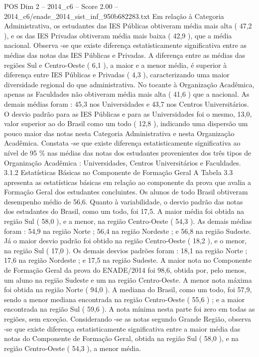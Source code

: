 \begin{textsample}{POS Dim 2 – 2014\_c6 – Score 2.00 – 2014\_c6/enade\_2014\_sist\_inf\_950b682283.txt}
Em relação à Categoria Administrativa, os estudantes das IES Públicas obtiveram média mais alta ( 47,2 ), e os das IES Privadas obtiveram média mais baixa ( 42,9 ), que a média nacional.
Observa -se que existe diferença estatisticamente significativa entre as médias das notas das IES Públicas e Privadas.
A diferença entre as médias das regiões Sul e Centro-Oeste ( 6,1 ), a maior e a menor média, é superior à diferença entre IES Públicas e Privadas ( 4,3 ), caracterizando uma maior diversidade regional do que administrativa.
No tocante à Organização Acadêmica, apenas as Faculdades não obtiveram média mais alta ( 41,6 ) que a nacional.
As demais médias foram : 45,3 nos Universidades e 43,7 nos Centros Universitários.
O desvio padrão para as IES Públicas e para as Universidades foi o mesmo, 13,0, valor superior ao do Brasil como um todo ( 12,8 ), indicando uma dispersão um pouco maior das notas nesta Categoria Administrativa e nesta Organização Acadêmica.
Constata -se que existe diferença estatisticamente significativa ao nível de 95 \% nas médias das notas dos estudantes provenientes dos três tipos de Organização Acadêmica : Universidades, Centros Universitários e Faculdades. 3.1.2 Estatísticas Básicas no Componente de Formação Geral A Tabela 3.3 apresenta as estatísticas básicas em relação ao componente da prova que avalia a Formação Geral dos estudantes concluintes.
Os alunos de todo Brasil obtiveram desempenho médio de 56,6.
Quanto à variabilidade, o desvio padrão das notas dos estudantes do Brasil, como um todo, foi 17,5.
A maior média foi obtida na região Sul ( 58,0 ), e a menor, na região Centro-Oeste ( 54,3 ).
As demais médias foram : 54,9 na região Norte ; 56,4 na região Nordeste ; e 56,8 na região Sudeste.
Já o maior desvio padrão foi obtido na região Centro-Oeste ( 18,2 ), e o menor, na região Sul ( 17,0 ).
Os demais desvios padrões foram : 18,1 na região Norte ; 17,6 na região Nordeste ; e 17,5 na região Sudeste.
A maior nota no Componente de Formação Geral da prova do ENADE/2014 foi 98,6, obtida por, pelo menos, um aluno na região Sudeste e um na região Centro-Oeste.
A menor nota máxima foi obtida na região Norte ( 94,0 ).
A mediana do Brasil, como um todo, foi 57,9, sendo a menor mediana encontrada na região Centro-Oeste ( 55,6 ) ; e a maior encontrada na região Sul ( 59,6 ).
A nota mínima nesta parte foi zero em todas as regiões, sem exceção.
Considerando -se as notas segundo Grande Região, observa -se que existe diferença estatisticamente significativa entre a maior média das notas do Componente de Formação Geral, obtida na região Sul ( 58,0 ), e na região Centro-Oeste ( 54,3 ), a menor média.

\end{textsample}
